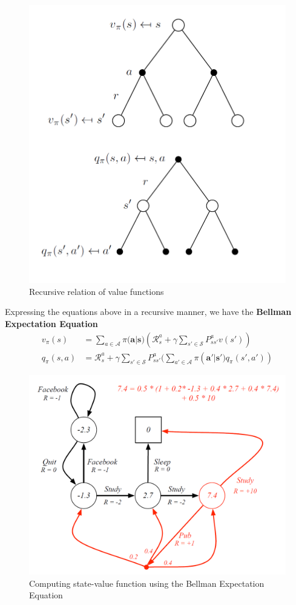 	\begin{figure}[h]
	\centering
	\includegraphics[scale=0.5]{ch2fig3.png}
	\caption{Recursive relation of value functions}
	\end{figure}

	Expressing the equations above in a recursive manner, we have the \textbf{Bellman Expectation Equation} 
	\begin{align*}
	v_\pi(s) &= \sum_{a \in \mathcal{A}}  \pi(\mathbf{a|s)} (\mathcal{R}^a_s + \gamma \sum_{s' \in \mathcal{S}} P^a_{ss'}v(s'))\\
	q_\pi(s,a) &= \mathcal{R}^a_s + \gamma \sum_{s' \in \mathcal{S}} P^a_{ss'}(\sum_{a' \in \mathcal{A}}  \pi(\mathbf{a'|s')}q_\pi(s',a')) 
	\end{align*}

	\begin{figure}[h]
	\centering
	\includegraphics[scale=0.5]{ch2fig4.png}
	\caption{Computing state-value function using the Bellman Expectation Equation}
	\end{figure}

